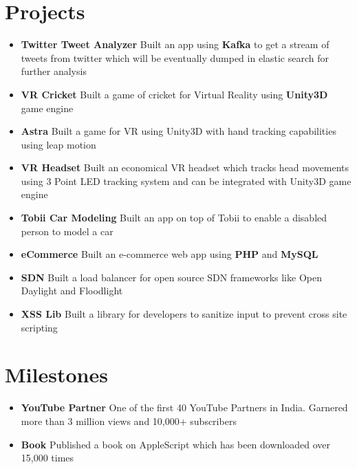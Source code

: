 \documentclass[a4paper,12pt]{article} %
\newcommand\zeroSpacing{0em}
\newcommand{\generalListStart}{\vspace{\zeroSpacing}\begin{itemize}[leftmargin=2em]\setlength\itemsep{-0.4em}}
\newcommand{\generalListEnd}{\end{itemize}\vspace{\zeroSpacing}}
\newcommand{\oneKeyValuePairElement}[2]{
	\item \textbf{#1}{ #2}
}
\begin{document}
\vspace{\zeroSpacing}\section*{Projects}
\generalListStart
	\vspace{-0.8em}\oneKeyValuePairElement{Twitter Tweet Analyzer}{Built an app using \textbf{Kafka} to get a stream of tweets from twitter which will be eventually dumped in elastic search for further analysis}
	\oneKeyValuePairElement{VR Cricket}{Built a game of cricket for Virtual Reality using \textbf{Unity3D} game engine}
	\oneKeyValuePairElement{Astra}{Built a game for VR using Unity3D with hand tracking capabilities using leap motion}
	\oneKeyValuePairElement{VR Headset}{Built an economical VR headset which tracks head movements using 3 Point LED tracking system and can be integrated with Unity3D game engine}
	\oneKeyValuePairElement{Tobii Car Modeling}{Built an app on top of Tobii to enable a disabled person to model a car}
	\oneKeyValuePairElement{eCommerce}{Built an e-commerce web app using \textbf{PHP} and \textbf{MySQL}}
	\oneKeyValuePairElement{SDN}{Built a load balancer for open source SDN frameworks like Open Daylight and Floodlight}
	\oneKeyValuePairElement{XSS Lib}{Built a library for developers to sanitize input to prevent cross site scripting}\vspace{\zeroSpacing}
\generalListEnd


\vspace{\zeroSpacing}\section*{Milestones}

\generalListStart
	\vspace{-0.8em}\oneKeyValuePairElement{YouTube Partner}{One of the first 40 YouTube Partners in India. Garnered more than 3 million views and 10,000+ subscribers}
	\oneKeyValuePairElement{Book}{Published a book on AppleScript which has been downloaded over 15,000 times}
\generalListEnd
\end{document}
